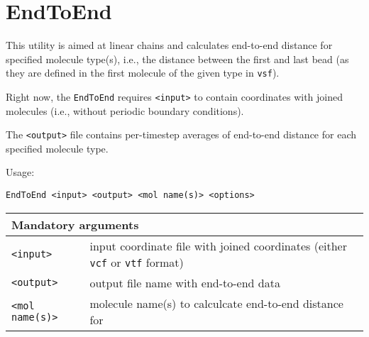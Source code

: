 \section{EndToEnd} \label{sec:EndToEnd}

This utility is aimed at linear chains and calculates end-to-end distance
for specified molecule type(s), i.e., the distance between the first and
last bead (as they are defined in the first molecule of the given type in
\texttt{vsf}).

Right now, the \texttt{EndToEnd} requires \texttt{<input>} to contain
coordinates with joined molecules (i.e., without periodic boundary
conditions).

The \texttt{<output>} file contains per-timestep averages of end-to-end distance for each
specified molecule type.

Usage:

\vspace{1em}
\noindent
\texttt{EndToEnd <input> <output> <mol name(s)> <options>}

\noindent
\begin{longtable}{p{}p{}}
  \toprule
  \multicolumn{2}{l}{Mandatory arguments} \\
  \midrule
  \texttt{<input>} & input coordinate file with joined coordinates (either
    \texttt{vcf} or \texttt{vtf} format) \\
  \texttt{<output>} & output file name with end-to-end data \\
  \texttt{<mol name(s)>} & molecule name(s) to calculcate end-to-end
    distance for \\
  \bottomrule
\end{longtable}
